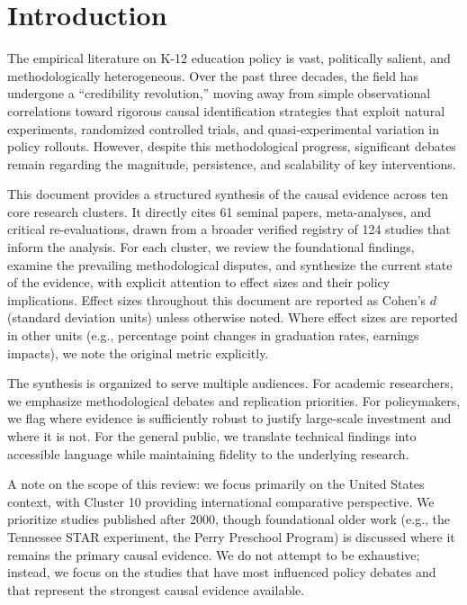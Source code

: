 \documentclass[12pt,letterpaper]{article}
\begin{document}
\tableofcontents
\newpage

\section{Introduction}

The empirical literature on K-12 education policy is vast, politically salient, and methodologically heterogeneous. Over the past three decades, the field has undergone a ``credibility revolution,'' moving away from simple observational correlations toward rigorous causal identification strategies that exploit natural experiments, randomized controlled trials, and quasi-experimental variation in policy rollouts. However, despite this methodological progress, significant debates remain regarding the magnitude, persistence, and scalability of key interventions.

This document provides a structured synthesis of the causal evidence across ten core research clusters. It directly cites 61 seminal papers, meta-analyses, and critical re-evaluations, drawn from a broader verified registry of 124 studies that inform the analysis. For each cluster, we review the foundational findings, examine the prevailing methodological disputes, and synthesize the current state of the evidence, with explicit attention to effect sizes and their policy implications. Effect sizes throughout this document are reported as Cohen's $d$ (standard deviation units) unless otherwise noted. Where effect sizes are reported in other units (e.g., percentage point changes in graduation rates, earnings impacts), we note the original metric explicitly.

The synthesis is organized to serve multiple audiences. For academic researchers, we emphasize methodological debates and replication priorities. For policymakers, we flag where evidence is sufficiently robust to justify large-scale investment and where it is not. For the general public, we translate technical findings into accessible language while maintaining fidelity to the underlying research.

A note on the scope of this review: we focus primarily on the United States context, with Cluster 10 providing international comparative perspective. We prioritize studies published after 2000, though foundational older work (e.g., the Tennessee STAR experiment, the Perry Preschool Program) is discussed where it remains the primary causal evidence. We do not attempt to be exhaustive; instead, we focus on the studies that have most influenced policy debates and that represent the strongest causal evidence available.
\end{document}
